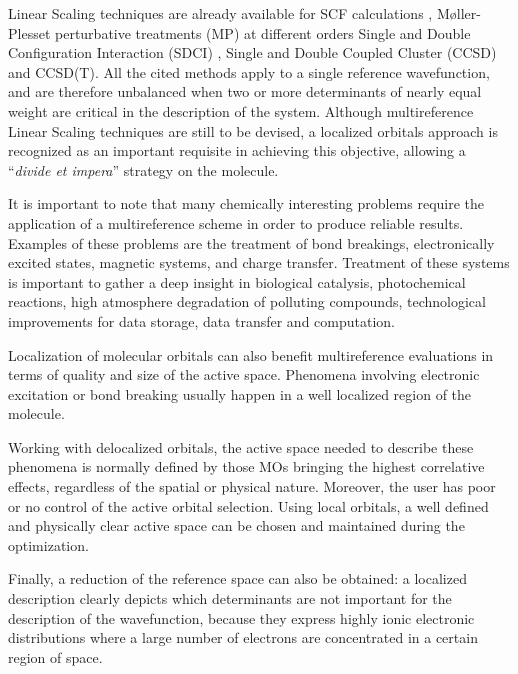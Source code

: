 Linear Scaling techniques are already available for SCF calculations
\cite{rmp-71-1085-1999}, M{\o}ller-Plesset perturbative treatments (MP) at
different orders
\cite{jcp-110-3660-1999,pulay-gdesmp,jcc-19-1241-1998,cpl-290-143-1998,
tca-69-357-1986,jcp-86-914-1987,ijqc-70-167-1998}
Single and Double Configuration Interaction (SDCI) \cite{jcp-104-6286-1996},
Single and Double
Coupled Cluster (CCSD)\cite{jcp-104-6286-1996,jcp-111-8330-1999}
and CCSD(T)\cite{jcp-113-9986-2000,jcp-114-661-2001}.  All the cited methods
apply to a single reference wavefunction, and are therefore unbalanced when
two or more determinants of nearly equal weight are critical in the
description of the system. %
Although multireference Linear Scaling techniques
are still to be devised, a localized orbitals approach is recognized as an
important requisite in achieving this objective, allowing a ``\textit{divide et
impera}'' strategy on the molecule.

It is important to note that many chemically interesting problems require
the application of a multireference scheme in order to produce reliable
results.  Examples of these problems are the treatment of bond breakings,
electronically excited states, magnetic systems, and charge transfer.
Treatment of these systems is important to gather a deep insight in
biological catalysis, photochemical reactions, high atmosphere degradation
of polluting compounds, technological improvements for data storage, data
transfer and computation. 

Localization of molecular orbitals can also benefit multireference
evaluations in terms of quality and size of the active space. 
Phenomena involving electronic excitation or bond breaking usually happen in a
well localized region of the molecule. 

Working with delocalized orbitals, the active space needed to describe these
phenomena is normally defined by those MOs bringing the highest correlative
effects, regardless of the spatial or physical nature. Moreover, the user
has poor or no control of the active orbital selection. Using local
orbitals, a well defined and physically clear active space can be chosen and
maintained during the optimization. 

Finally, a reduction of the reference space can also be obtained: a
localized description clearly depicts which determinants are not important
for the description of the wavefunction, because they express highly ionic
electronic distributions where a large number of electrons are concentrated
in a certain region of space. 

